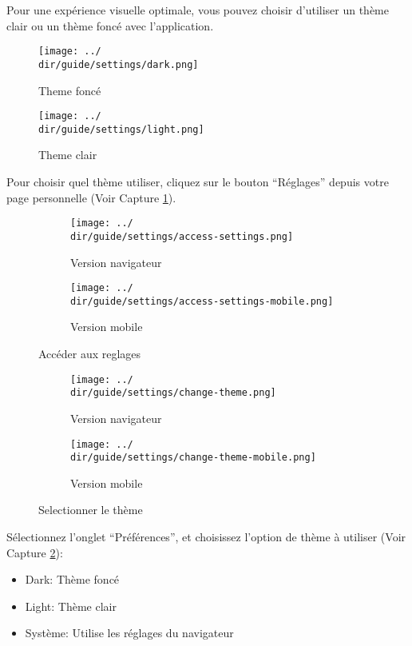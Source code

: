 Pour une expérience visuelle optimale, vous pouvez choisir d’utiliser un thème clair ou un thème foncé avec l’application.

\begin{multicols}{2}
\begin{figure}[H]
	\texttt{[image: ../\\dir/guide/settings/dark.png]}
	\caption{Theme foncé}
\end{figure}
\begin{figure}[H]
	\texttt{[image: ../\\dir/guide/settings/light.png]}
	\caption{Theme clair}
\end{figure}
\end{multicols}

Pour choisir quel thème utiliser, cliquez sur le bouton “Réglages” depuis votre page personnelle (Voir Capture \ref{fig:access-settings-theme}).

\begin{figure}[H]
	\begin{subfigure}[b]{0.7\textwidth}
		\texttt{[image: ../\\dir/guide/settings/access-settings.png]}
		\caption{Version navigateur}
	\end{subfigure}
	\begin{subfigure}[b]{0.25\textwidth}
		\texttt{[image: ../\\dir/guide/settings/access-settings-mobile.png]}
		\caption{Version mobile}
	\end{subfigure}
	\caption{Accéder aux reglages}
	\label{fig:access-settings-theme}
\end{figure}
\begin{figure}[H]
	\begin{subfigure}[b]{0.7\textwidth}
		\texttt{[image: ../\\dir/guide/settings/change-theme.png]}
		\caption{Version navigateur}
	\end{subfigure}
	\begin{subfigure}[b]{0.25\textwidth}
		\texttt{[image: ../\\dir/guide/settings/change-theme-mobile.png]}
		\caption{Version mobile}
	\end{subfigure}
	\caption{Selectionner le thème}
	\label{fig:change-theme}
\end{figure}

Sélectionnez l’onglet “Préférences”, et choisissez l’option de thème à utiliser (Voir Capture \ref{fig:change-theme}):

\begin{itemize}
 	\item Dark: Thème foncé
 	\item Light: Thème clair
 	\item Système: Utilise les réglages du navigateur
\end{itemize}
